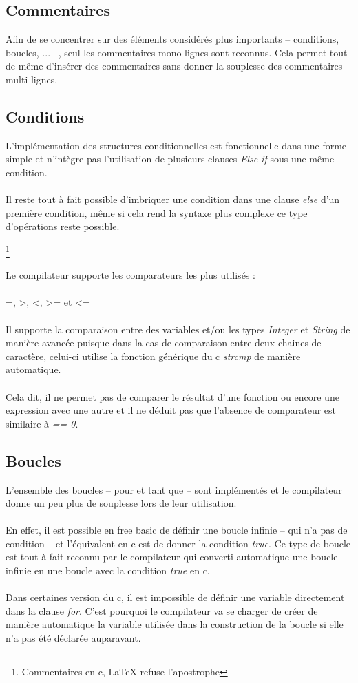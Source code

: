 \documentclass{article}
\begin{document}
\subsection{Commentaires}
Afin de se concentrer sur des éléments considérés plus importants -- conditions, boucles, ... --, seul les
commentaires mono-lignes sont reconnus. Cela permet tout de même d'insérer des commentaires sans donner 
la souplesse des commentaires multi-lignes.

\subsection{Conditions}
L'implémentation des structures conditionnelles est fonctionnelle dans une forme simple et n'intègre pas
l'utilisation de plusieurs clauses \emph{Else if} sous une même condition.
\\\\
Il reste tout à fait possible d'imbriquer une condition dans une clause \emph{else} d'un première condition,
même si cela rend la syntaxe plus complexe ce type d'opérations reste possible.

\lstset{language=c,caption=Raccourci de syntaxe pour les conditions, upquote=true}
\footnote{Commentaires en c, LaTeX refuse l'apostrophe}

Le compilateur supporte les comparateurs les plus utilisés : 	
\\\\
=, >, <, >= et <=
\\\\
Il supporte la comparaison entre 
des variables et/ou les types \emph{Integer} et \emph{String} de manière avancée puisque dans la cas de comparaison
entre deux chaines de caractère, celui-ci utilise la fonction générique du c \emph{strcmp} de manière automatique.
\\\\
Cela dit, il ne permet pas de comparer le résultat d'une fonction ou encore une expression avec une autre et il 
ne déduit pas que l'absence de comparateur est similaire à \emph{== 0}.
\subsection{Boucles}
L'ensemble des boucles -- pour et tant que -- sont implémentés et le compilateur donne un peu plus 
de souplesse lors de leur utilisation.
\\\\
En effet, il est possible en free basic de définir une boucle infinie -- qui n'a pas de condition -- et 
l'équivalent en c est de donner la condition \emph{true}. Ce type de boucle est tout à fait reconnu par le 
compilateur qui converti automatique une boucle infinie en une boucle avec la condition \emph{true} en c.
\\\\
Dans certaines version du c, il est impossible de définir une variable directement dans la clause \emph{for}.
C'est pourquoi le compilateur va se charger de créer de manière automatique la variable utilisée dans 
la construction de la boucle si elle n'a pas été déclarée auparavant.
\end{document}
